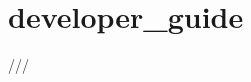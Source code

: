 \chapter{developer\+\_\+guide }
\hypertarget{md_dev_2developer__guide}{}\label{md_dev_2developer__guide}
/// 